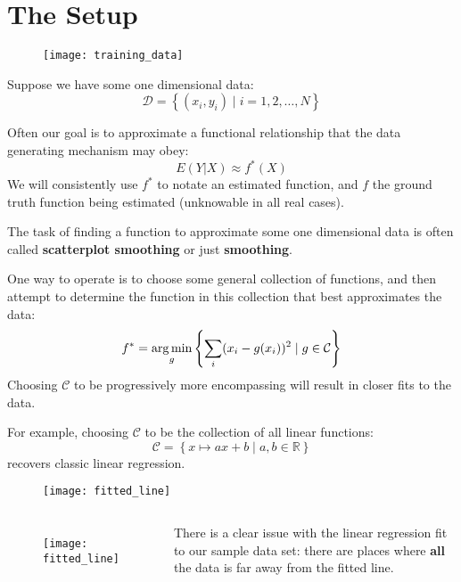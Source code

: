 \section{The Setup}
%
\begin{frame}
  \begin{figure}
    \texttt{[image: training\_data]}
  \end{figure}
  Suppose we have some one dimensional data:
  $$\mathcal{D} = \left\{ (x_i, y_i) \mid i = 1,2,\ldots,N \right\}$$
\end{frame}
%
\begin{frame}
  Often our goal is to approximate a functional relationship that the data generating mechanism may obey:
  $$E(Y|X) \approx f^*(X)$$
  We will consistently use $f^*$ to notate an estimated function, and $f$ the ground truth function being estimated (unknowable in all real cases).
\end{frame}
%
\begin{frame}
  The task of finding a function to approximate some one dimensional data is often called \textbf{scatterplot smoothing} or just \textbf{smoothing}.
\end{frame}
%
\begin{frame}
  One way to operate is to choose some general collection of functions, and then attempt to determine the function in this collection that best approximates the data:
  $$ f^* = \operatorname*{arg\,min}_{g} \left\{ \sum_i (x_i - g(x_i))^2 \mid g \in \mathcal{C} \right\} $$
  Choosing $\mathcal{C}$ to be progressively more encompassing will result in closer fits to the data.
\end{frame}
%
\begin{frame}
  For example, choosing $\mathcal{C}$ to be the collection of all linear functions:
  $$ \mathcal{C} = \left\{ x \mapsto ax + b \mid a,b \in \mathbb{R} \right\} $$
recovers classic linear regression.
  \begin{figure}
    \texttt{[image: fitted\_line]}
  \end{figure}
\end{frame}
%
\begin{frame}
  \begin{columns}
      \begin{figure}
        \texttt{[image: fitted\_line]}
      \end{figure}
      There is a clear issue with the linear regression fit to our sample data set: there are places where \textbf{all} the data is far away from the fitted line.
  \end{columns}
\end{frame}
